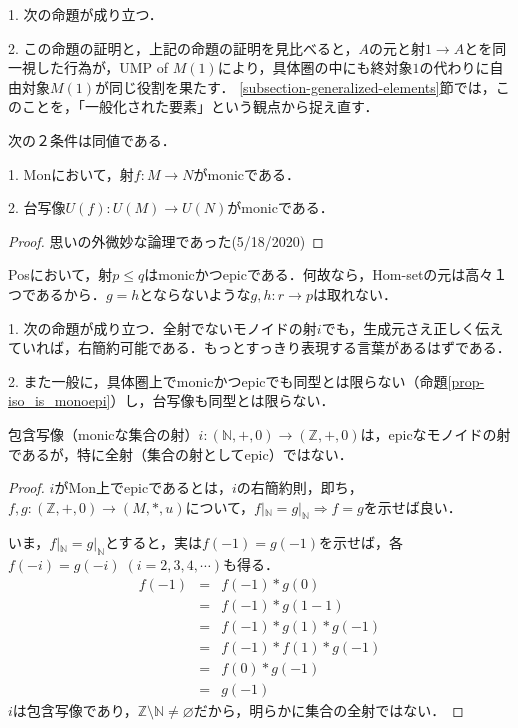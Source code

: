 \documentclass[uplatex, dvipdfmx]{jsarticle}
\begin{document}
\begin{example}
    1. 次の命題が成り立つ．
    
    2. この命題の証明と，上記の命題の証明を見比べると，$A$の元と射$1\to A$とを同一視した行為が，UMP of $M(1)$により，具体圏の中にも終対象$1$の代わりに自由対象$M(1)$が同じ役割を果たす．
    \ref{subsection-generalized-elements}節では，このことを，「一般化された要素」という観点から捉え直す．
\end{example}

\begin{proposition*}次の２条件は同値である．

    1. Monにおいて，射$f:M\to N$がmonicである．
    
    2. 台写像$U(f):U(M)\to U(N)$がmonicである．
\end{proposition*}
\begin{proof}
    思いの外微妙な論理であった(5/18/2020)
\end{proof}

\begin{example}
    Posにおいて，射$p\le q$はmonicかつepicである．何故なら，Hom-setの元は高々１つであるから．$g=h$とならないような$g,h:r\to p$は取れない．
\end{example}

\begin{example}\label{example-epis-notnecessarily-surjective}
    1. 次の命題が成り立つ．全射でないモノイドの射$i$でも，生成元さえ正しく伝えていれば，右簡約可能である．もっとすっきり表現する言葉があるはずである．

    2. また一般に，具体圏上でmonicかつepicでも同型とは限らない（命題\ref{prop-iso_is_monoepi}）し，台写像も同型とは限らない．
    \begin{proposition*}[全写でないモノイドのepic射]
        包含写像（monicな集合の射）$i:(\mathbb{N},+,0)\to(\mathbb{Z},+,0)$は，epicなモノイドの射であるが，特に全射（集合の射としてepic）ではない．
    \end{proposition*}
    \begin{proof}
        $i$がMon上でepicであるとは，$i$の右簡約則，即ち，$f,g:(\mathbb{Z},+,0)\to (M,*,u)$について，$f|_\mathbb{N}=g|_\mathbb{N}\Rightarrow f=g$を示せば良い．

        いま，$f|_\mathbb{N}=g|_\mathbb{N}$とすると，実は$f(-1)=g(-1)$を示せば，各$f(-i)=g(-i)\; (i=2,3,4,\cdots)$も得る．
        \begin{eqnarray*}
            f(-1) &=& f(-1)*g(0) \\
            &=& f(-1)*g(1-1) \\
            &=& f(-1)*g(1)*g(-1) \\
            &=& f(-1)*f(1)*g(-1) \\
            &=& f(0)*g(-1) \\
            &=& g(-1)
        \end{eqnarray*}
        $i$は包含写像であり，$\mathbb{Z}\setminus\mathbb{N}\ne\varnothing$だから，明らかに集合の全射ではない．
    \end{proof}
\end{example}
\end{document}
